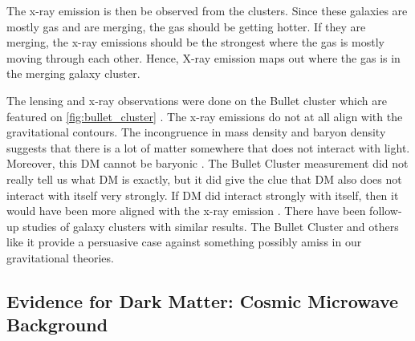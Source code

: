 The x-ray emission is then be observed from the clusters.
Since these galaxies are mostly gas and are merging, the gas should be getting hotter.
If they are merging, the x-ray emissions should be the strongest where the gas is mostly moving through each other.
Hence, X-ray emission maps out where the gas is in the merging galaxy cluster.

The lensing and x-ray observations were done on the Bullet cluster which are featured on \cref{fig:bullet_cluster} \cite{Clowe:BulletCluster}.
The x-ray emissions do not at all align with the gravitational contours.
The incongruence in mass density and baryon density suggests that there is a lot of matter somewhere that does not interact with light.
Moreover, this DM cannot be baryonic \cite{Clowe:BulletCluster}.
The Bullet Cluster measurement did not really tell us what DM is exactly, but it did give the clue that DM also does not interact with itself very strongly.
If DM did interact strongly with itself, then it would have been more aligned with the x-ray emission \cite{Clowe:BulletCluster}.
There have been follow-up studies of galaxy clusters with similar results.
The Bullet Cluster and others like it provide a persuasive case against something possibly amiss in our gravitational theories.

\subsection{Evidence for Dark Matter: Cosmic Microwave Background\label{sec:ev4dm_cmb}}

\begin{figure}[h]
\end{figure}

